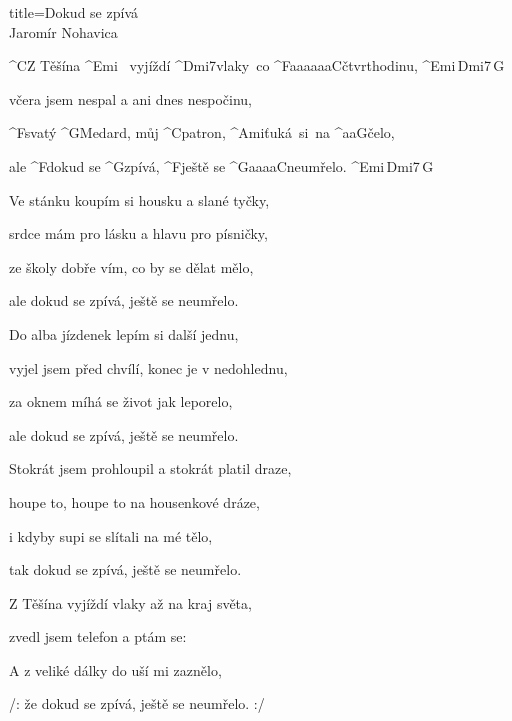 \begin{song}{title=\predtitle\centering Dokud se zpívá \\\large Jaromír Nohavica  \vspace*{-0.3cm}}  %
\begin{centerjustified}
\nejnejvetsi

\sloka 
	^{C}Z Těšína ^{Emi\,\,\,\,\,}vyjíždí ^{Dmi7\z}vlaky~co ^{F{\color{white}aaaaaa}C}čtvrthodinu, ^{Emi\,Dmi7\,G}

	včera jsem nespal a ani dnes nespočinu,

	^{F}svatý ^{G}Medard, můj ^{C}patron, ^{\z Ami\:\:\:}ťuká~si~na ^{{\color{white}aa}G}čelo,

	ale ^{F}dokud se ^{G}zpívá, ^{F}ještě se ^{G{\color{white}aaaa}C}neumřelo. ^{Emi\,Dmi7\,G}

\sloka
	Ve stánku koupím si housku a slané tyčky,
	
	srdce mám pro lásku a hlavu pro písničky,
	
	ze školy dobře vím, co by se dělat mělo,
	
	ale dokud se zpívá, ještě se neumřelo.

\sloka
	Do alba jízdenek lepím si další jednu,

	vyjel jsem před chvílí, konec je v nedohlednu,
	
	za oknem míhá se život jak leporelo,
	
	ale dokud se zpívá, ještě se neumřelo.

\sloka
	Stokrát jsem prohloupil a stokrát platil draze,
	
	houpe to, houpe to na housenkové dráze,
	
	i kdyby supi se slítali na mé tělo,
	
	tak dokud se zpívá, ještě se neumřelo.

\sloka
	Z Těšína vyjíždí vlaky až na kraj světa,
	
	zvedl jsem telefon a ptám se: 
	
	A z veliké dálky do uší mi zaznělo,
	
	/: že dokud se zpívá, ještě se neumřelo. :/


\end{centerjustified}
\setcounter{Slokočet}{0}
\end{song}
